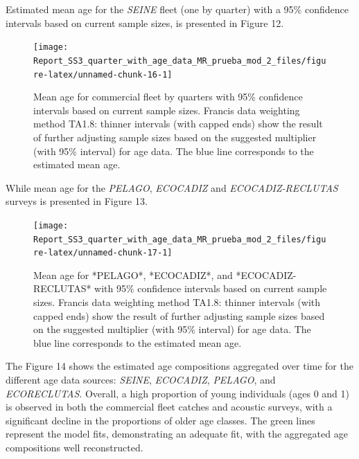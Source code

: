 \documentclass[
]{article}
\begin{document}
Estimated mean age for the \emph{SEINE} fleet (one by quarter) with a
95\% confidence intervals based on current sample sizes, is presented in
Figure 12.

\begin{figure}[H]

{\centering \texttt{[image: Report\_SS3\_quarter\_with\_age\_data\_MR\_prueba\_mod\_2\_files/figure-latex/unnamed-chunk-16-1]} 

}

\caption{Mean age for commercial fleet by quarters with 95\% confidence intervals based on current sample sizes. Francis data weighting method TA1.8: thinner intervals (with capped ends) show the result of further adjusting sample sizes based on the suggested multiplier (with 95\% interval) for age data. The blue line corresponds to the estimated mean age.}\label{fig:unnamed-chunk-16}
\end{figure}

While mean age for the \emph{PELAGO}, \emph{ECOCADIZ} and
\emph{ECOCADIZ-RECLUTAS} surveys is presented in Figure 13.

\begin{figure}[H]

{\centering \texttt{[image: Report\_SS3\_quarter\_with\_age\_data\_MR\_prueba\_mod\_2\_files/figure-latex/unnamed-chunk-17-1]} 

}

\caption{Mean age for *PELAGO*, *ECOCADIZ*, and *ECOCADIZ-RECLUTAS* with 95\% confidence intervals based on current sample sizes. Francis data weighting method TA1.8: thinner intervals (with capped ends) show the result of further adjusting sample sizes based on the suggested multiplier (with 95\% interval) for age data. The blue line corresponds to the estimated mean age.}\label{fig:unnamed-chunk-17}
\end{figure}

The Figure 14 shows the estimated age compositions aggregated over time
for the different age data sources: \emph{SEINE}, \emph{ECOCADIZ},
\emph{PELAGO}, and \emph{ECORECLUTAS}. Overall, a high proportion of
young individuals (ages 0 and 1) is observed in both the commercial
fleet catches and acoustic surveys, with a significant decline in the
proportions of older age classes. The green lines represent the model
fits, demonstrating an adequate fit, with the aggregated age
compositions well reconstructed.
\end{document}
